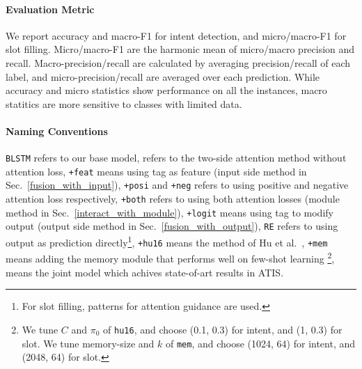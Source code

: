 \paragraph{Evaluation Metric}
We report accuracy and macro-F1 for intent detection, and micro/macro-F1 for slot filling.
Micro/macro-F1 are the harmonic mean of micro/macro precision and recall.
Macro-precision/recall are calculated by averaging precision/recall of each label, and micro-precision/recall are averaged over each prediction. 
While accuracy and micro statistics show performance on all the instances, macro statitics are more sensitive to classes with limited data.

\paragraph{Naming Conventions}
\texttt{BLSTM} refers to our base model,
\ptatt refers to the two-side attention method without attention loss,
\texttt{+feat} means using \RE tag as feature (input side method in Sec.~\ref{fusion_with_input}),
\texttt{+posi} and \texttt{+neg} refers to using positive and negative attention loss respectively, \texttt{+both} refers to using both attention losses (\NN module method in Sec.~\ref{interact_with_module}),
\texttt{+logit} means using \RE tag to modify \NN output (output side method in Sec.~\ref{fusion_with_output}),
\texttt{RE} refers to using \RE output as prediction directly\footnote{
For slot filling, patterns for attention guidance are used.}, 
\texttt{+hu16} means the method of Hu et al.~,
\texttt{+mem} means adding the memory module that performs well on few-shot learning \cite{kaiser2017learning}\footnote{
We tune $C$ and $\pi_0$ of \texttt{hu16}, and choose (0.1, 0.3) for intent, and (1, 0.3) for slot. We tune memory-size and $k$ of \texttt{mem}, and choose (1024, 64) for intent, and (2048, 64) for slot.
}, 
\LL means the joint model \cite{liu2016attention} which achives state-of-art results in ATIS. 



